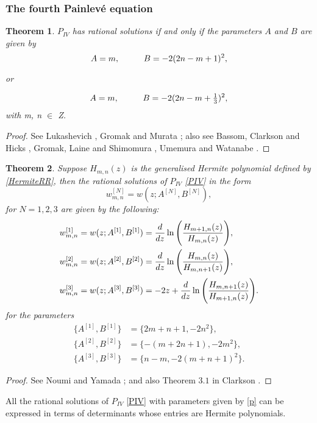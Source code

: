 \documentclass[12pt]{article}
\def\P{Painlev\'e }
\newtheorem{mydef}{Theorem}[section]
\numberwithin{figure}{section}
\numberwithin{equation}{section}
\numberwithin{table}{section}
\begin{document}
\subsubsection{The fourth \P equation}
\begin{mydef}
$P_{IV}$ has rational solutions if and only if the parameters $A$ and $B$ are given by
\begin{equation}
A=m, \hspace{10mm} B=-2(2n-m+1)^2 \label{p},
\end{equation}
\begin{center}
or
\end{center}
\begin{equation}
A=m, \hspace{10mm} B=-2(2n-m+\tfrac{1}{3})^2, \label{q}
\end{equation}
with m, n $\in$ Z.
\end{mydef}
\begin{proof}
See Lukashevich \cite{P:3:395}, Gromak \cite{P:23:506} and Murata \cite{P:28:32}; also see Bassom, Clarkson and Hicks \cite{P:95:71}, Gromak, Laine and Shimomura \cite{deGruyerCo}, Umemura and Watanabe \cite{P:148:198}.
\end{proof}
\begin{mydef}
Suppose $H_{m,n}(z)$ is the generalised Hermite polynomial defined by \eqref{HermiteRR}, then the rational solutions of $P_{IV}$ \eqref{PIV} in the form $$w^{[N]}_{m,n}=w(z;A^{[N]},B^{[N]}),$$ for $N=1,2,3$ are given by the following:
\begin{subequations}
\begin{align*}\nonumber
w^{[1]}_{m,n}&=w(z;A^{[1]},B^{[1]})=\frac{d}{dz}\ln\Bigg{(}\frac{H_{m+1,n}(z)}{H_{m,n}(z)}\Bigg{)},\\
w^{[2]}_{m,n}&=w(z;A^{[2]},B^{[2]})=\frac{d}{dz}\ln\Bigg{(}\frac{H_{m,n}(z)}{H_{m,n+1}(z)}\Bigg{)},\\
w^{[3]}_{m,n}&=w(z;A^{[3]},B^{[3]})=-2z+\frac{d}{dz}\ln\Bigg{(}\frac{H_{m,n+1}(z)}{H_{m+1,n}(z)}\Bigg{)}.
\end{align*}
\end{subequations}
for the parameters
\begin{subequations}
\begin{align*}\nonumber
\{A^{[1]},B^{[1]}\}&=\{2m+n+1,-2n^2\},\\
\{A^{[2]},B^{[2]}\}&=\{-(m+2n+1),-2m^2\},\\
\{A^{[3]},B^{[3]}\}&=\{n-m,-2(m+n+1)^2\}.
\end{align*}
\end{subequations}
\end{mydef}
\begin{proof}
See Noumi and Yamada \cite{P:153:86}; and also Theorem $3.1$ in Clarkson \cite{P:44:5374}.
\end{proof}
All the rational solutions of $P_{IV}$ \eqref{PIV} with parameters given by \eqref{p} can be expressed in terms of determinants whose entries are Hermite polynomials.
\end{document}
